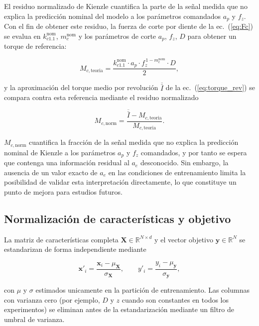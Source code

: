 \documentclass[12pt, letterpaper]{article}
\begin{document}
El residuo normalizado de Kienzle cuantifica la parte de la señal medida que no explica la predicción nominal del modelo a los parámetros comandados $a_p$ y $f_z$. Con el fin de obtener este residuo, la fuerza de corte por diente de la ec.~(\ref{eq:Fc}) se evalua en $k_{c1.1}^{\text{nom}}$, $m_c^{\text{nom}}$ y los parámetros de corte $a_p$, $f_z$, $D$ para obtener un torque de referencia:

\begin{equation}
  M_{c,\text{teoria}} = \frac{k_{c1.1}^{\text{nom}} \cdot a_p \cdot f_z^{\,1-m_c^{\text{nom}}} \cdot D}{2},
  \label{eq:Mc_teoria}
\end{equation}

y la aproximación del torque medio por revolución $\overline{\bar{I}}$ de la ec.~(\ref{eq:torque_rev}) se compara contra esta referencia mediante el residuo normalizado

\begin{equation}
  M_{c,\text{norm}} = \frac{\overline{\bar{I}} - M_{c,\text{teoria}}}{M_{c,\text{teoria}}}.
  \label{eq:Mc_norm}
\end{equation}

$M_{c,\text{norm}}$ cuantifica la fracción de la señal medida que no explica la predicción nominal de Kienzle a los parámetros $a_p$ y $f_z$ comandados, y por tanto se espera que contenga una información residual al $a_e$ desconocido. Sin embargo, la ausencia de un valor exacto de $a_e$ en las condiciones de entrenamiento limita la posibilidad de validar esta interpretación directamente, lo que constituye un punto de mejora para estudios futuros.

\subsection{Normalización de características y objetivo}

La matriz de características completa $\mathbf{X} \in \mathbb{R}^{N \times d}$ y el vector objetivo $\mathbf{y} \in \mathbb{R}^{N}$ se estandarizan de forma independiente mediante

\begin{equation}
  \mathbf{x}'_{i} = \frac{\mathbf{x}_i - \mu_{\mathbf{X}}}{\sigma_{\mathbf{X}}}, \qquad
  y'_{i} = \frac{y_i - \mu_{\mathbf{y}}}{\sigma_{\mathbf{y}}},
  \label{eq:estandarizacion}
\end{equation}

con $\mu$ y $\sigma$ estimados unicamente en la partición de entrenamiento. Las columnas con varianza cero (por ejemplo, $D$ y $z$ cuando son constantes en todos los experimentos) se eliminan antes de la estandarización mediante un filtro de umbral de varianza.
\end{document}
